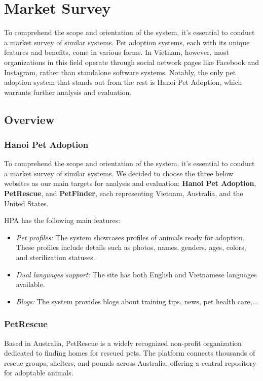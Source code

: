 \section{Market Survey}
To comprehend the scope and orientation of the system, it’s essential to conduct a market survey of similar systems. Pet adoption systems, each with its unique features and benefits, come in various forms. In Vietnam, however, most organizations in this field operate through social network pages like Facebook and Instagram, rather than standalone software systems. Notably, the only pet adoption system that stands out from the rest is Hanoi Pet Adoption, which warrants further analysis and evaluation.

\subsection{Overview}
\subsubsection*{Hanoi Pet Adoption}
To comprehend the scope and orientation of the system, it’s essential to conduct a market survey of similar systems. We decided to choose the three below websites as our main targets for analysis and evaluation:
\textbf{Hanoi Pet Adoption}, \textbf{PetRescue}, and \textbf{PetFinder}, each representing Vietnam, Australia, and the United States.

HPA has the following main features:
\begin{itemize}
  \item \textit{Pet profiles:} The system showcases profiles of animals ready for adoption. These profiles include details such as photos, names, genders, ages, colors, and sterilization statuses.
  \item \textit{Dual languages support:} The site has both English and Vietnamese languages available.
  \item \textit{Blogs:}  The system provides blogs about training tips, news, pet health care,...
\end{itemize}

\subsubsection*{PetRescue}

Based in Australia, PetRescue is a widely recognized non-profit organization dedicated to finding homes for rescued pets. The platform connects thousands of rescue groups, shelters, and pounds across Australia, offering a central repository for adoptable animals.

